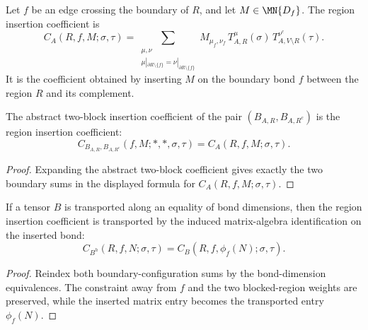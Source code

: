 \begin{definition}%
    \label{def:peps_regionInsertedCoeff}
    \leanok
    Let $f$ be an edge crossing the boundary of $R$, and let
    $M\in\MN{D_f}$.  The region insertion coefficient is
    \[
        C_A(R,f,M;\sigma,\tau)
        =
        \sum_{\substack{\mu,\nu\\
        \mu|_{\partial R\setminus\{f\}}
        =\nu|_{\partial R\setminus\{f\}}}}
        M_{\mu_f,\nu_f}\,
        T_{A,R}^{\mu}(\sigma)\,
        T_{A,V\setminus R}^{\nu^c}(\tau).
    \]
    It is the coefficient obtained by inserting $M$ on the boundary bond $f$
    between the region $R$ and its complement.
\end{definition}

\begin{theorem}%
    \label{thm:peps_twoBlockInsertedCoeff_eq_regionInsertedCoeff}
    \leanok
    The abstract two-block insertion coefficient of the pair
    $(B_{A,R},B_{A,R^c})$ is the region insertion coefficient:
    \[
        C_{B_{A,R},B_{A,R^c}}(f,M;*,*,\sigma,\tau)
        =
        C_A(R,f,M;\sigma,\tau).
    \]
\end{theorem}
\begin{proof}\leanok
    Expanding the abstract two-block coefficient gives exactly the two boundary
    sums in the displayed formula for $C_A(R,f,M;\sigma,\tau)$.
\end{proof}

\begin{theorem}%
    \label{thm:peps_regionInsertedCoeff_reindexTensor}
    \leanok
    If a tensor $B$ is transported along an equality of bond dimensions, then
    the region insertion coefficient is transported by the induced
    matrix-algebra identification on the inserted bond:
    \[
        C_{B^h}(R,f,N;\sigma,\tau)
        =
        C_B(R,f,\phi_f(N);\sigma,\tau).
    \]
\end{theorem}
\begin{proof}\leanok
    Reindex both boundary-configuration sums by the bond-dimension
    equivalences. The constraint away from $f$ and the two blocked-region
    weights are preserved, while the inserted matrix entry becomes the
    transported entry $\phi_f(N)$.
\end{proof}

